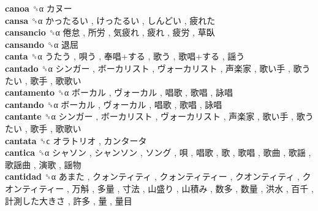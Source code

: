 \textbf{canoa} ␝α   カヌー   \\
\textbf{cansa} ␝α   かったるい ,  けったるい ,  しんどい ,  疲れた   \\
\textbf{cansancio} ␝α   倦怠 ,  所労 ,  気疲れ ,  疲れ ,  疲労 ,  草臥   \\
\textbf{cansando} ␝α   退屈   \\
\textbf{canta} ␝α   うたう ,  唄う ,  奉唱+する ,  歌う ,  歌唱+する ,  謡う   \\
\textbf{cantado} ␝α   シンガー ,  ボーカリスト ,  ヴォーカリスト ,  声楽家 ,  歌い手 ,  歌うたい ,  歌手 ,  歌歌い   \\
\textbf{cantamento} ␝α   ボーカル ,  ヴォーカル ,  唱歌 ,  歌唱 ,  詠唱   \\
\textbf{cantando} ␝α   ボーカル ,  ヴォーカル ,  唱歌 ,  歌唱 ,  詠唱   \\
\textbf{cantante} ␝α   シンガー ,  ボーカリスト ,  ヴォーカリスト ,  声楽家 ,  歌い手 ,  歌うたい ,  歌手 ,  歌歌い   \\
\textbf{cantata} ␝ϲ   オラトリオ ,  カンタータ   \\
\textbf{cantica} ␝α   シャソン ,  シャンソン ,  ソング ,  唄 ,  唱歌 ,  歌 ,  歌唱 ,  歌曲 ,  歌謡 ,  歌謡曲 ,  演歌 ,  謡物   \\
\textbf{cantidad} ␝α   あまた ,  クォンティティ ,  クォンティティー ,  クオンティティ ,  クオンティティー ,  万斛 ,  多量 ,  寸法 ,  山盛り ,  山積み ,  数多 ,  数量 ,  洪水 ,  百千 ,  計測した大きさ ,  許多 ,  量 ,  量目   \\
